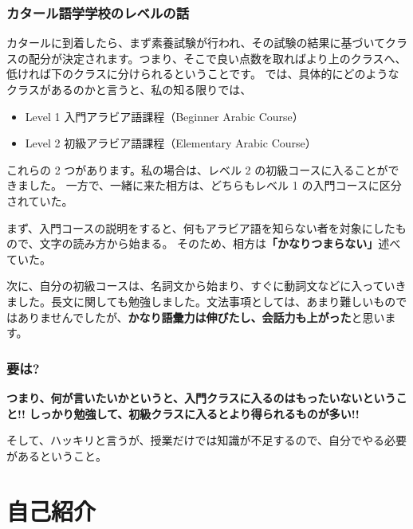\documentclass[
]{book}
\providecommand{\tightlist}{%
  \setlength{\itemsep}{0pt}\setlength{\parskip}{0pt}}
\begin{document}
\hypertarget{level}{%
\subsection*{カタール語学学校のレベルの話}\label{level}}

カタールに到着したら、まず素養試験が行われ、その試験の結果に基づいてクラスの配分が決定されます。つまり、そこで良い点数を取ればより上のクラスへ、低ければ下のクラスに分けられるということです。 では、具体的にどのようなクラスがあるのかと言うと、私の知る限りでは、

\begin{itemize}
\tightlist
\item
  Level 1 入門アラビア語課程（Beginner Arabic Course）
\item
  Level 2 初級アラビア語課程（Elementary Arabic Course）
\end{itemize}

これらの 2 つがあります。私の場合は、レベル 2 の初級コースに入ることができました。 一方で、一緒に来た相方は、どちらもレベル 1 の入門コースに区分されていた。

まず、入門コースの説明をすると、何もアラビア語を知らない者を対象にしたもので、文字の読み方から始まる。 そのため、相方は\textbf{「かなりつまらない」}述べていた。

次に、自分の初級コースは、名詞文から始まり、すぐに動詞文などに入っていきました。長文に関しても勉強しました。文法事項としては、あまり難しいものではありませんでしたが、\textbf{かなり語彙力は伸びたし、会話力も上がった}と思います。

\hypertarget{nut_shell}{%
\subsection*{要は?}\label{nut_shell}}

\textbf{つまり、何が言いたいかというと、入門クラスに入るのはもったいないということ!!} \textbf{しっかり勉強して、初級クラスに入るとより得られるものが多い!!}

そして、ハッキリと言うが、授業だけでは知識が不足するので、自分でやる必要があるということ。

\hypertarget{author}{%
\chapter*{自己紹介}\label{author}}
\end{document}
